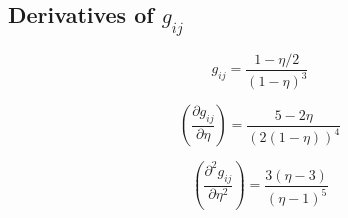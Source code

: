 \documentclass[internal,english]{sintefmemo2012}
\newcommand*{\pder}[2]{\left(\frac{\partial #1}{\partial #2}\right)}
\newcommand*{\pdder}[2]{\left(\frac{\partial^2 #1}{\partial #2^2}\right)}
\newcommand{\z}{\zeta}
\newcommand{\lp}{\left(}
\newcommand{\rp}{\right)}
\begin{document}

\subsection{Derivatives of $g_{ij}$}
\begin{equation}
  g_{ij} = \frac{1-\eta/2}{(1-\eta)^3}
\end{equation}

\begin{equation}
  \pder{g_{ij}}{\eta} = \frac{5-2\eta}{(2(1-\eta))^4}
\end{equation}

\begin{equation}
  \pdder{g_{ij}}{\eta} = \frac{3(\eta-3)}{(\eta-1)^5}
\end{equation}


\end{document}
